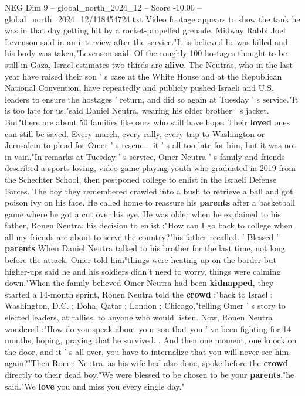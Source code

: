 \begin{textsample}{NEG Dim 9 – global\_north\_2024\_12 – Score -10.00 – global\_north\_2024\_12/118454724.txt}
Video footage appears to show the tank he was in that day getting hit by a rocket-propelled grenade, Midway Rabbi Joel Levenson said in an interview after the service."It is believed he was killed and his body was taken,"Levenson said.
Of the roughly 100 hostages thought to be still in Gaza, Israel estimates two-thirds are \textbf{alive}.
The Neutras, who in the last year have raised their son ' s case at the White House and at the Republican National Convention, have repeatedly and publicly pushed Israeli and U.S. leaders to ensure the hostages ' return, and did so again at Tuesday ' s service."It is too late for us,"said Daniel Neutra, wearing his older brother ' s jacket.
But"there are about 50 families like ours who still have hope.
Their \textbf{loved} ones can still be saved.
Every march, every rally, every trip to Washington or Jerusalem to plead for Omer ' s rescue -- it ' s all too late for him, but it was not in vain."In remarks at Tuesday ' s service, Omer Neutra ' s family and friends described a sports-loving, video-game playing youth who graduated in 2019 from the Schechter School, then postponed college to enlist in the Israeli Defense Forces.
The boy they remembered crawled into a bush to retrieve a ball and got poison ivy on his face.
He called home to reassure his \textbf{parents} after a basketball game where he got a cut over his eye.
He was older when he explained to his father, Ronen Neutra, his decision to enlist :"How can I go back to college when all my friends are about to serve the country?"his father recalled. ' Blessed ' \textbf{parents} When Daniel Neutra talked to his brother for the last time, not long before the attack, Omer told him"things were heating up on the border but higher-ups said he and his soldiers didn't need to worry, things were calming down."When the family believed Omer Neutra had been \textbf{kidnapped}, they started a 14-month sprint, Ronen Neutra told the \textbf{crowd} :"back to Israel ; Washington, D.C. ; Doha, Qatar ; London ; Chicago,"telling Omer ' s story to elected leaders, at rallies, to anyone who would listen.
Now, Ronen Neutra wondered :"How do you speak about your son that you ' ve been fighting for 14 months, hoping, praying that he survived...
And then one moment, one knock on the door, and it ' s all over, you have to internalize that you will never see him again?"Then Ronen Neutra, as his wife had also done, spoke before the \textbf{crowd} directly to their dead boy."We were blessed to be chosen to be your \textbf{parents},"he said."We \textbf{love} you and miss you every single day."

\end{textsample}
